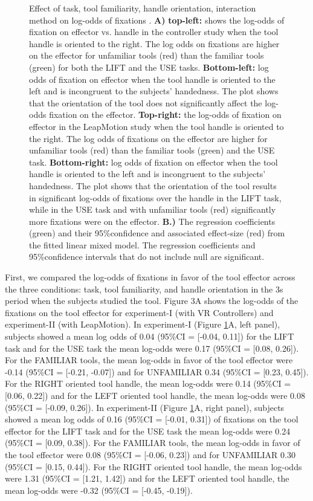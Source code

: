 \begin{figure}[ht]
    \caption[]{Effect of task, tool familiarity, handle orientation, interaction method on log-odds of fixations . \textbf{A)} \textbf{top-left:} shows the log-odds of fixation on effector vs. handle in the controller study when the tool handle is oriented to the right. The log odds on fixations are higher on the effector for unfamiliar tools (red) than the familiar tools (green) for both the LIFT and the USE tasks. \textbf{Bottom-left:} log odds of fixation on effector when the tool handle is oriented to the left and is incongruent to the subjects’ handedness. The plot shows that the orientation of the tool does not significantly affect the log-odds fixation on the effector. \textbf{Top-right:} the log-odds of fixation on effector in the LeapMotion study when the tool handle is oriented to the right. The log odds of fixations on the effector are higher for unfamiliar tools (red) than the familiar tools (green) and the USE task. \textbf{Bottom-right:} log odds of fixation on effector when the tool handle is oriented to the left and is incongruent to the subjects’ handedness. The plot shows that the orientation of the tool results in significant log-odds of fixations over the handle in the LIFT task, while in the USE task and with unfamiliar tools (red) significantly more fixations were on the effector. \textbf{B.)} The regression coefficients (green) and their 95\%confidence and associated effect-size (red) from the fitted linear mixed model. The regression coefficients and 95\%confidence intervals that do not include null are significant. 
}
    \label{figure:log_odds}
\end{figure}

First, we compared the log-odds of fixations in favor of the tool effector across the three conditions: task, tool familiarity, and handle orientation in the 3s period when the subjects studied the tool. Figure 3A shows the log-odds of the fixations on the tool effector for experiment-I (with VR Controllers) and experiment-II (with LeapMotion). In experiment-I (Figure \ref{figure:log_odds}A, left panel), subjects showed a mean log odds of 0.04 (95\%CI = [-0.04, 0.11]) for the LIFT task and for the USE task the mean log-odds were 0.17 (95\%CI = [0.08, 0.26]). For the FAMILIAR tools, the mean log-odds in favor of the tool effector were -0.14 (95\%CI = [-0.21, -0.07]) and for UNFAMILIAR 0.34 (95\%CI = [0.23, 0.45]). For the  RIGHT oriented tool handle, the mean log-odds were 0.14 (95\%CI = [0.06, 0.22]) and for the LEFT oriented tool handle, the mean log-odds were 0.08 (95\%CI = [-0.09, 0.26]). In experiment-II (Figure \ref{figure:log_odds}A, right panel), subjects showed a mean log odds of 0.16 (95\%CI = [-0.01, 0.31]) of fixations on the tool effector for the LIFT task and for the USE task the mean log-odds were 0.24 (95\%CI = [0.09, 0.38]). For the FAMILIAR tools, the mean log-odds in favor of the tool effector were 0.08 (95\%CI = [-0.06, 0.23]) and for UNFAMILIAR 0.30 (95\%CI = [0.15, 0.44]). For the RIGHT oriented tool handle, the mean log-odds were 1.31 (95\%CI = [1.21, 1.42]) and for the LEFT oriented tool handle, the mean log-odds were -0.32 (95\%CI = [-0.45, -0.19]). 

